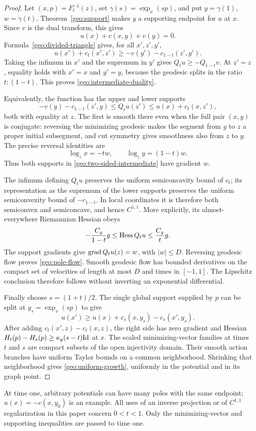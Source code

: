 \begin{proof}
Let $(x,p)=F_t^{-1}(z)$, set $\gamma(s)=\exp_x(sp)$, and put
$y=\gamma(1)$, $w=\dot\gamma(t)$.  Theorem~\ref{geo:support}
makes $y$ a supporting endpoint for $u$ at $x$. Since $v$ is the dual
transform, this gives
\[
 u(x)+c(x,y)+v(y)=0.
\]
Formula~\eqref{geo:divided-triangle} gives, for all $x',z',y'$,
\[
 u(x')+c_t(x',z')
 \geq -v(y')-c_{1-t}(z',y').
\]
Taking the infimum in $x'$ and the supremum in $y'$ gives
$Q_tu\geq-Q_{1-t}v$.  At $z'=z$, equality holds with $x'=x$ and
$y'=y$, because the geodesic splits in the ratio $t:(1-t)$.
This proves \eqref{geo:intermediate-duality}.

Equivalently, the function has the upper and lower supports
\begin{equation}
 \label{geo:two-sided-intermediate}
 -v(y)-c_{1-t}(z',y)
 \leq Q_tu(z')
 \leq u(x)+c_t(x,z'),
\end{equation}
both with equality at $z$.  The first is smooth there even when the
full pair $(x,y)$ is conjugate: reversing the minimizing geodesic
makes the segment from $y$ to $z$ a proper initial subsegment, and
cut symmetry gives smoothness also from $z$ to $y$.
The precise reversal identities are
\[
 \log_zx=-tw,\qquad \log_zy=(1-t)w.
\]
Thus both supports in \eqref{geo:two-sided-intermediate} have
gradient $w$.

The infimum defining $Q_tu$ preserves the uniform semiconcavity
bound of $c_t$; its representation as the supremum of the lower
supports preserves the uniform semiconvexity bound of $-c_{1-t}$.
In local coordinates it is therefore both semiconvex and semiconcave,
and hence $C^{1,1}$.  More explicitly, its almost-everywhere
Riemannian Hessian obeys
\[
 -\frac{C_g}{1-t}g\leq\operatorname{Hess} Q_tu\leq\frac{C_g}{t}g.
\]
The support gradients give $\operatorname{grad} Q_tu(z)=w$, with $|w|\leq D$.
Reversing geodesic flow proves \eqref{geo:pole-flow}.  Smooth geodesic
flow has bounded derivatives on the compact set of velocities of
length at most $D$ and times in $[-1,1]$.  The Lipschitz conclusion
therefore follows without inverting an exponential differential.

Finally choose $s=(1+t)/2$.  The single global support supplied by
$p$ can be split at $y_s=\exp_x(sp)$ to give
\[
 u(x')\geq u(x)+c_s(x,y_s)-c_s(x',y_s).
\]
After adding $c_t(x',z)-c_t(x,z)$, the right side has zero gradient
and Hessian $H_t(p)-H_s(p)\geq\kappa_g(s-t)\mathrm{Id}$ at $x$.
The scaled minimizing-vector families at times $t$ and $s$ are
compact subsets of the open injectivity domain.  Their smooth action
branches have uniform Taylor bounds on a common neighborhood.
Shrinking that neighborhood gives \eqref{geo:uniform-growth},
uniformly in the potential and in its graph point.
\end{proof}

\begin{remark}
\label{geo:time-one}
At time one, arbitrary potentials can have many poles with the same
endpoint; $u(x)=-c(x,y_0)$ is an example.  All uses of an inverse
projection or of $C^{1,1}$ regularization in this paper concern $0<t<1$.
Only the minimizing-vector and supporting inequalities are passed
to time one.
\end{remark}
